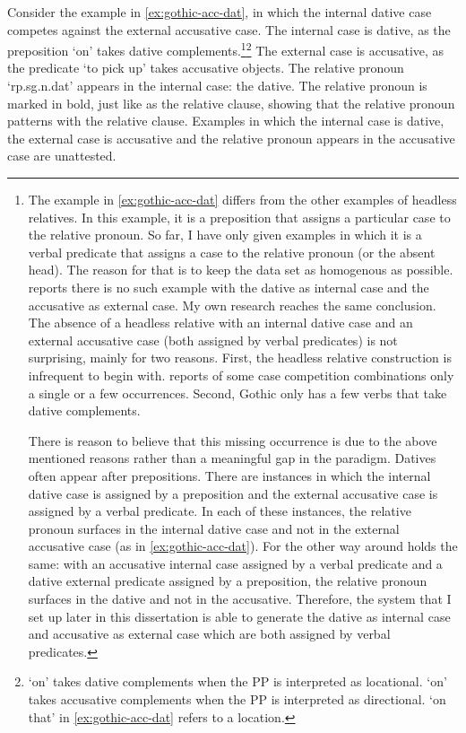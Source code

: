 Consider the example in \ref{ex:gothic-acc-dat}, in which the internal dative case competes against the external accusative case.
The internal case is dative, as the preposition  `on' takes dative complements.\footnote{
The example in \ref{ex:gothic-acc-dat} differs from the other examples of headless relatives. In this example, it is a preposition that assigns a particular case to the relative pronoun. So far, I have only given examples in which it is a verbal predicate that assigns a case to the relative pronoun (or the absent head). The reason for that is to keep the data set as homogenous as possible. \citet{harbert1978} reports there is no such example with the dative as internal case and the accusative as external case. My own research reaches the same conclusion. The absence of a headless relative with an internal dative case and an external accusative case (both assigned by verbal predicates) is not surprising, mainly for two reasons. First, the headless relative construction is infrequent to begin with. \citeauthor{harbert1978} reports of some case competition combinations only a single or a few occurrences.
Second, Gothic only has a few verbs that take dative complements.

There is reason to believe that this missing occurrence is due to the above mentioned reasons rather than a meaningful gap in the paradigm. Datives often appear after prepositions. There are instances in which the internal dative case is assigned by a preposition and the external accusative case is assigned by a verbal predicate. In each of these instances, the relative pronoun surfaces in the internal dative case and not in the external accusative case (as in \ref{ex:gothic-acc-dat}). For the other way around holds the same: with an accusative internal case assigned by a verbal predicate and a dative external predicate assigned by a preposition, the relative pronoun surfaces in the dative and not in the accusative. Therefore, the system that I set up later in this dissertation is able to generate the dative as internal case and accusative as external case which are both assigned by verbal predicates.
}\footnote{
 `on' takes dative complements when the PP is interpreted as locational.  `on' takes accusative complements when the PP is interpreted as directional.  `on that' in \ref{ex:gothic-acc-dat} refers to a location.
}
The external case is accusative, as the predicate  `to pick up' takes accusative objects.
The relative pronoun  `\ac{rp}.\ac{sg}.\ac{n}.\ac{dat}' appears in the internal case: the dative. The relative pronoun is marked in bold, just like as the relative clause, showing that the relative pronoun patterns with the relative clause.
Examples in which the internal case is dative, the external case is accusative and the relative pronoun appears in the accusative case are unattested.

